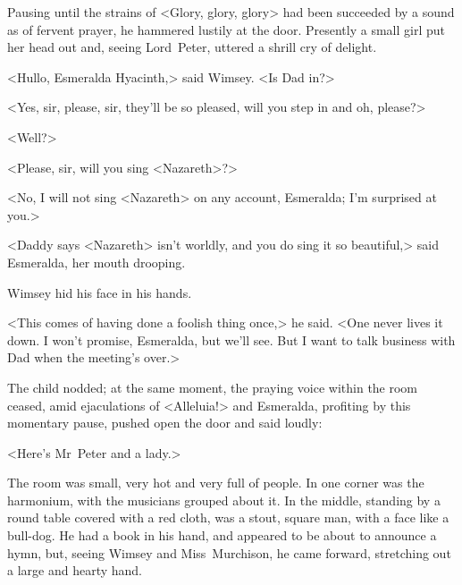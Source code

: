Pausing until the strains of <Glory, glory, glory> had been succeeded by a sound as of fervent prayer, he hammered lustily at the door. Presently a small girl put her head out and, seeing Lord~Peter, uttered a shrill cry of delight.

<Hullo, Esmeralda Hyacinth,> said Wimsey. <Is Dad in?>

<Yes, sir, please, sir, they'll be so pleased, will you step in and oh, please?>

<Well?>

<Please, sir, will you sing <Nazareth>?>

<No, I will not sing <Nazareth> on any account, Esmeralda; I'm surprised at you.>

<Daddy says <Nazareth> isn't worldly, and you do sing it so beautiful,> said Esmeralda, her mouth drooping.

Wimsey hid his face in his hands.

<This comes of having done a foolish thing once,> he said. <One never lives it down. I won't promise, Esmeralda, but we'll see. But I want to talk business with Dad when the meeting's over.>

The child nodded; at the same moment, the praying voice within the room ceased, amid ejaculations of <Alleluia!> and Esmeralda, profiting by this momentary pause, pushed open the door and said loudly:

<Here's Mr~Peter and a lady.>

The room was small, very hot and very full of people. In one corner was the harmonium, with the musicians grouped about it. In the middle, standing by a round table covered with a red cloth, was a stout, square man, with a face like a bull-dog. He had a book in his hand, and appeared to be about to announce a hymn, but, seeing Wimsey and Miss~Murchison, he came forward, stretching out a large and hearty hand.

